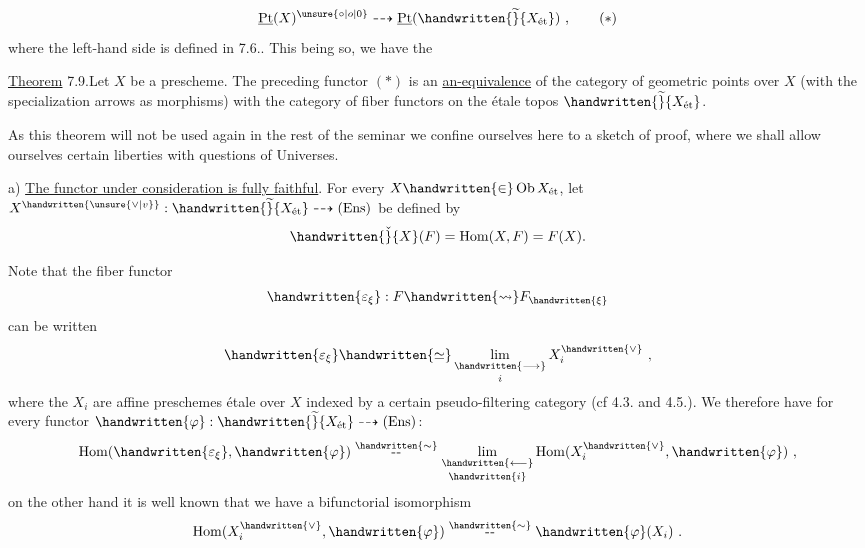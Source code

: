 \begingroup
\makeatletter\tagsleft@true\makeatother
\[
\underline{\mathrm{Pt}}(X)^{\unsure{\circ|o|0}}\dashrightarrow
\underline{\mathrm{Pt}}(\handwritten{\widetilde}{X_{\text{ét}}})\ ,
\tag*{$(*)$}
\]
where the left-hand side is defined in 7.6.. This being so, we have the

\noindent\uline{Theorem} 7.9.\quad Let $X$ be a prescheme. The preceding functor $(*)$ is an \uline{an-equivalence} of the category of geometric points over $X$ (with the specialization arrows as morphisms) with the category of fiber functors on the étale topos $\handwritten{\widetilde}{X_{\text{ét}}}$.

As this theorem will not be used again in the rest of the seminar we confine ourselves here to a sketch of proof, where we shall allow ourselves certain liberties with questions of Universes.

a) \uline{The functor under consideration is fully faithful}. For every $X\handwritten{\in}\operatorname{Ob} X_{\text{ét}}$, let $X^{\handwritten{\unsure{\vee|v}}}: \handwritten{\widetilde}{X_{\text{ét}}} \dashrightarrow (\mathrm{Ens})$ be defined by
\[
\handwritten{\check}{X}(F) = \operatorname{Hom}(X,F) = F(X).
\]

\noindent Note that the fiber functor
\[
\handwritten{\varepsilon_{\xi}} : F \handwritten{\rightsquigarrow} F_{\handwritten{\xi}}
\]
can be written
\[
\handwritten{\varepsilon_{\xi}} \handwritten{\simeq} \mathop{\underset{\handwritten{\longrightarrow}}{\mathrm{lim}}}\limits_i X_i^{\handwritten{\vee}}\ ,
\]
where the $X_i$ are affine preschemes étale over $X$ indexed by a certain pseudo-filtering category (cf 4.3. and 4.5.). We therefore have for every functor $\handwritten{\varphi}: \handwritten{\widetilde}{X_{\text{ét}}} \dashrightarrow (\mathrm{Ens})$:
\[
\operatorname{Hom}(\handwritten{\varepsilon_{\xi}},\handwritten{\varphi}) \mathrel{\mathop{\text{-\kern.04em-}}\limits^{\handwritten{\sim}}} \mathop{\underset{\handwritten{\longleftarrow}}{\mathrm{lim}}}\limits_{\handwritten{i}} \operatorname{Hom}(X_i^{\handwritten{\vee}},\handwritten{\varphi})\ ,
\]
on the other hand it is well known that we have a bifunctorial isomorphism
\[
\operatorname{Hom}(X_i^{\handwritten{\vee}},\handwritten{\varphi}) \mathrel{\mathop{\text{-\kern.04em-}}\limits^{\handwritten{\sim}}} \handwritten{\varphi}(X_i)\ .
\]

\endgroup

